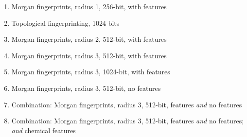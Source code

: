 \documentclass[11pt]{article}
\begin{document}
\begin{enumerate}[A:]
\item Morgan fingerprints, radius 1, 256-bit, with features
\item Topological fingerprinting, 1024 bits
\item Morgan fingerprints, radius 2, 512-bit, with features
\item Morgan fingerprints, radius 3, 512-bit, with features
\item Morgan fingerprints, radius 3, 1024-bit, with features
\item Morgan fingerprints, radius 3, 512-bit, no features
\item Combination: Morgan fingerprints, radius 3, 512-bit, features \textit{and} no features
\item Combination: Morgan fingerprints, radius 3, 512-bit, features \textit{and} no features; \textit{and} chemical features
\end{enumerate}

\begin{table}[H]
\centering
{}
\caption{Matrix of RMSE results for various feature sets and regressors; (*) is the final submission}
\label{rmse-all}
\end{table}
\end{document}
